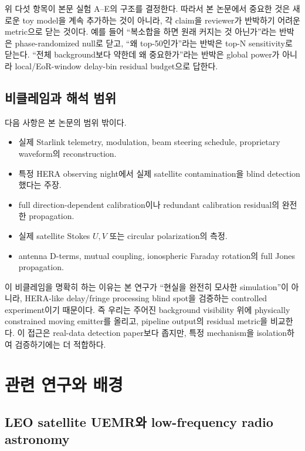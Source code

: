 \documentclass[11pt,a4paper]{article}
\begin{document}
위 다섯 항목이 본문 실험 A--E의 구조를 결정한다.
따라서 본 논문에서 중요한 것은 새로운 toy model을 계속 추가하는 것이 아니라, 각 claim을 reviewer가 반박하기 어려운 metric으로 닫는 것이다.
예를 들어 ``복소합을 하면 원래 커지는 것 아닌가''라는 반박은 phase-randomized null로 닫고, ``왜 top-50인가''라는 반박은 top-N sensitivity로 닫는다.
``전체 background보다 약한데 왜 중요한가''라는 반박은 global power가 아니라 local/EoR-window delay-bin residual budget으로 답한다.

\subsection{비클레임과 해석 범위}

다음 사항은 본 논문의 범위 밖이다.

\begin{itemize}
  \item 실제 Starlink telemetry, modulation, beam steering schedule, proprietary waveform의 reconstruction.
  \item 특정 HERA observing night에서 실제 satellite contamination을 blind detection했다는 주장.
  \item full direction-dependent calibration이나 redundant calibration residual의 완전한 propagation.
  \item 실제 satellite Stokes $U,V$ 또는 circular polarization의 측정.
  \item antenna D-terms, mutual coupling, ionospheric Faraday rotation의 full Jones propagation.
\end{itemize}

이 비클레임을 명확히 하는 이유는 본 연구가 ``현실을 완전히 모사한 simulation''이 아니라, HERA-like delay/fringe processing blind spot을 검증하는 controlled experiment이기 때문이다.
즉 우리는 주어진 background visibility 위에 physically constrained moving emitter를 올리고, pipeline output의 residual metric을 비교한다.
이 접근은 real-data detection paper보다 좁지만, 특정 mechanism을 isolation하여 검증하기에는 더 적합하다.

\section{관련 연구와 배경}

\subsection{LEO satellite UEMR와 low-frequency radio astronomy}
\end{document}
